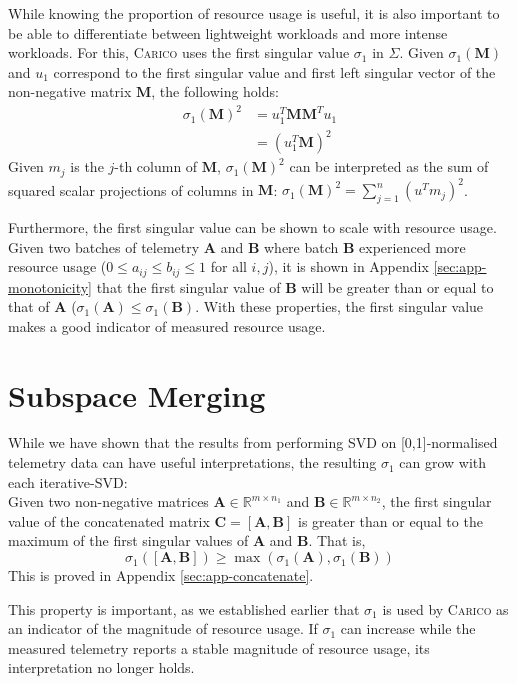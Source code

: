 While knowing the proportion of resource usage is useful, it is also important
to be able to differentiate between lightweight workloads and more intense
workloads. For this, \textsc{Carico} uses the first singular value $\sigma_1$ in
$\Sigma$. Given $\sigma_1(\mathbf{M})$ and $u_1$ correspond to the first singular value and
first left singular vector of the non-negative matrix $\mathbf{M}$, the
following holds:
\begin{align}
    \sigma_1(\mathbf{M})^2 &= u_1^T \mathbf{MM}^T u_1 \\
    &= (u_1^T \mathbf{M})^2
\end{align}
Given $m_j$ is the $j$-th column of $\mathbf{M}$, $\sigma_1(\mathbf{M})^2$ can be
interpreted as the sum of squared scalar projections of columns in $\mathbf{M}$:
$\sigma_1(\mathbf{M})^2 = \sum_{j=1}^n (u^T m_j)^2$.

Furthermore, the first singular value can be shown to scale with resource usage.
Given two batches of telemetry $\mathbf{A}$ and $\mathbf{B}$ where batch
$\mathbf{B}$ experienced more resource usage ($0 \leq a_{ij} \leq b_{ij} \leq 1$
for all $i,j$), it is shown in Appendix \ref{sec:app-monotonicity} that the
first singular value of $\mathbf{B}$ will be greater than or equal to that of
$\mathbf{A}$ ($\sigma_1(\mathbf{A}) \leq \sigma_1(\mathbf{B})$. With these
properties, the first singular value makes a good indicator of measured resource
usage.

\section{Subspace Merging}
\label{sec:local-merge}
While we have shown that the results from performing SVD on [0,1]-normalised
telemetry data can have useful interpretations, the resulting $\sigma_1$ can
grow with each iterative-SVD:\\
Given two non-negative matrices $\mathbf{A} \in \mathbb{R}^{m \times n_1}$ and
$\mathbf{B} \in \mathbb{R}^{m \times n_2}$, the first singular value of the
concatenated matrix $\mathbf{C} = [\mathbf{A}, \mathbf{B}]$ is greater than or
equal to the maximum of the first singular values of $\mathbf{A}$ and
$\mathbf{B}$. That is,
\[ \sigma_1([\mathbf{A}, \mathbf{B}]) \geq \max(\sigma_1(\mathbf{A}),
\sigma_1(\mathbf{B})) \]
This is proved in Appendix \ref{sec:app-concatenate}.

This property is important, as we established earlier that $\sigma_1$ is used by
\textsc{Carico} as an indicator of the magnitude of resource usage. If
$\sigma_1$ can increase while the measured telemetry reports a stable magnitude
of resource usage, its interpretation no longer holds.

